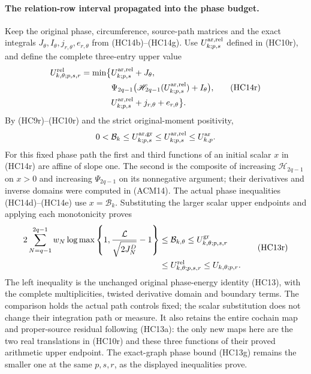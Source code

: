\paragraph{The relation-row interval propagated into the phase budget.}
Keep the original phase, circumference, source-path matrices and
the exact integrals $J_\theta,I_\theta,j_{r,\theta},e_{r,\theta}$
from (HC14b)--(HC14g). Use $U_{k;p,s}^{\rm ar,rel}$ defined in
(HC10r), and define the complete three-entry upper value
\[
\begin{aligned}
 U_{k,\theta;p,s,r}^{\rm rel}
 =\min\bigl\{&U_{k;p,s}^{\rm ar,rel}+J_\theta,\\
 &\Psi_{2q-1}\bigl(\mathscr H_{2q-1}
            (U_{k;p,s}^{\rm ar,rel})+I_\theta\bigr),\\
 &U_{k;p,s}^{\rm ar,rel}+j_{r,\theta}+e_{r,\theta}\bigr\}.
\end{aligned}\tag{HC14r}
\]
By (HC9r)--(HC10r) and the strict original-moment positivity,
\[
 0<\mathcal B_k\leq U_{k;p,s}^{\rm ar,gr}
             \leq U_{k;p,s}^{\rm ar,rel}\leq U_{k,p}^{\rm ar}.
\]
For this fixed phase path the first and third functions of an
initial scalar $x$ in (HC14r) are affine of slope one. The second
is the composite of increasing $\mathscr H_{2q-1}$ on $x>0$
and increasing $\Psi_{2q-1}$ on its nonnegative argument; their
derivatives and inverse domains were computed in (ACM14).
The actual phase inequalities (HC14d)--(HC14e) use
$x=\mathcal B_k$. Substituting the larger scalar upper endpoints
and applying each monotonicity proves
\[
\begin{aligned}
2\sum_{N=q-1}^{2q-1}w_N
 \log\max\left\{1,\frac{\mathcal L}{\sqrt{2J_N^D}}-1\right\}
 &\leq\mathcal B_{k,\theta}\leq U_{k,\theta;p,s,r}^{\rm gr}\\
 &\leq U_{k,\theta;p,s,r}^{\rm rel}\leq U_{k,\theta;p,r}.
\end{aligned}\tag{HC13r}
\]
The left inequality is the unchanged original phase-energy
identity (HC13), with the complete multiplicities, twisted
derivative domain and boundary terms. The comparison holds the
actual path controls fixed; the scalar substitution does not
change their integration path or measure. It also retains the
entire cochain map and proper-source residual following (HC13a):
the only new maps here are the two real translations in (HC10r)
and these three functions of their proved arithmetic upper
endpoint. The exact-graph phase bound (HC13g) remains the smaller
one at the same $p,s,r$, as the displayed inequalities prove.

